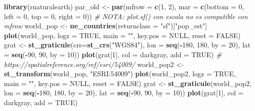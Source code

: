 \documentclass[
]{book}
\newenvironment{Shaded}{\begin{snugshade}}{\end{snugshade}}
\newcommand{\AttributeTok}[1]{\textcolor[rgb]{0.13,0.29,0.53}{#1}}
\newcommand{\CommentTok}[1]{\textcolor[rgb]{0.56,0.35,0.01}{\textit{#1}}}
\newcommand{\ConstantTok}[1]{\textcolor[rgb]{0.56,0.35,0.01}{#1}}
\newcommand{\DecValTok}[1]{\textcolor[rgb]{0.00,0.00,0.81}{#1}}
\newcommand{\FunctionTok}[1]{\textcolor[rgb]{0.13,0.29,0.53}{\textbf{#1}}}
\newcommand{\NormalTok}[1]{#1}
\newcommand{\OtherTok}[1]{\textcolor[rgb]{0.56,0.35,0.01}{#1}}
\newcommand{\SpecialCharTok}[1]{\textcolor[rgb]{0.81,0.36,0.00}{\textbf{#1}}}
\newcommand{\StringTok}[1]{\textcolor[rgb]{0.31,0.60,0.02}{#1}}
\theoremstyle{break}
\theoremstyle{definition}
\theoremstyle{definition}
\theoremstyle{definition}
\theoremstyle{definition}
\theoremstyle{remark}
\begin{document}
\begin{Shaded}
\begin{Highlighting}[]
\FunctionTok{library}\NormalTok{(rnaturalearth) }
\NormalTok{par\_old }\OtherTok{\textless{}{-}} \FunctionTok{par}\NormalTok{(}\AttributeTok{mfrow =} \FunctionTok{c}\NormalTok{(}\DecValTok{1}\NormalTok{, }\DecValTok{2}\NormalTok{), }\AttributeTok{mar =} \FunctionTok{c}\NormalTok{(}\AttributeTok{bottom =} \DecValTok{0}\NormalTok{, }\AttributeTok{left =} \DecValTok{0}\NormalTok{, }\AttributeTok{top =} \DecValTok{0}\NormalTok{, }\AttributeTok{right =} \DecValTok{0}\NormalTok{))}
\CommentTok{\# NOTA: plot.sf() con escala no es compatible con mfrow }
\NormalTok{world\_pop }\OtherTok{\textless{}{-}} \FunctionTok{ne\_countries}\NormalTok{(}\AttributeTok{returnclass =} \StringTok{"sf"}\NormalTok{)[}\StringTok{"pop\_est"}\NormalTok{]}
\FunctionTok{plot}\NormalTok{(world\_pop, }\AttributeTok{logz =} \ConstantTok{TRUE}\NormalTok{, }\AttributeTok{main =} \StringTok{""}\NormalTok{, }\AttributeTok{key.pos =} \ConstantTok{NULL}\NormalTok{, }\AttributeTok{reset =} \ConstantTok{FALSE}\NormalTok{)}
\NormalTok{grat }\OtherTok{\textless{}{-}} \FunctionTok{st\_graticule}\NormalTok{(}\AttributeTok{crs=}\FunctionTok{st\_crs}\NormalTok{(}\StringTok{"WGS84"}\NormalTok{), }\AttributeTok{lon =} \FunctionTok{seq}\NormalTok{(}\SpecialCharTok{{-}}\DecValTok{180}\NormalTok{, }\DecValTok{180}\NormalTok{, }\AttributeTok{by =} \DecValTok{20}\NormalTok{), }\AttributeTok{lat =} \FunctionTok{seq}\NormalTok{(}\SpecialCharTok{{-}}\DecValTok{90}\NormalTok{, }\DecValTok{90}\NormalTok{, }\AttributeTok{by =} \DecValTok{10}\NormalTok{))}
\FunctionTok{plot}\NormalTok{(grat[}\DecValTok{1}\NormalTok{], }\AttributeTok{col =} \StringTok{\textquotesingle{}darkgray\textquotesingle{}}\NormalTok{, }\AttributeTok{add =} \ConstantTok{TRUE}\NormalTok{)}
\CommentTok{\# https://spatialreference.org/ref/esri/54009/}
\NormalTok{world\_pop2 }\OtherTok{\textless{}{-}} \FunctionTok{st\_transform}\NormalTok{(world\_pop, }\StringTok{"ESRI:54009"}\NormalTok{) }
\FunctionTok{plot}\NormalTok{(world\_pop2, }\AttributeTok{logz =} \ConstantTok{TRUE}\NormalTok{, }\AttributeTok{main =} \StringTok{""}\NormalTok{, }\AttributeTok{key.pos =} \ConstantTok{NULL}\NormalTok{, }\AttributeTok{reset =} \ConstantTok{FALSE}\NormalTok{)}
\NormalTok{grat }\OtherTok{\textless{}{-}} \FunctionTok{st\_graticule}\NormalTok{(world\_pop2, }\AttributeTok{lon =} \FunctionTok{seq}\NormalTok{(}\SpecialCharTok{{-}}\DecValTok{180}\NormalTok{, }\DecValTok{180}\NormalTok{, }\AttributeTok{by =} \DecValTok{20}\NormalTok{), }\AttributeTok{lat =} \FunctionTok{seq}\NormalTok{(}\SpecialCharTok{{-}}\DecValTok{90}\NormalTok{, }\DecValTok{90}\NormalTok{, }\AttributeTok{by =} \DecValTok{10}\NormalTok{))}
\FunctionTok{plot}\NormalTok{(grat[}\DecValTok{1}\NormalTok{], }\AttributeTok{col =} \StringTok{\textquotesingle{}darkgray\textquotesingle{}}\NormalTok{, }\AttributeTok{add =} \ConstantTok{TRUE}\NormalTok{)}
\end{Highlighting}
\end{Shaded}
\end{document}
